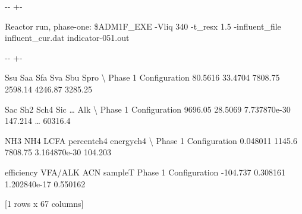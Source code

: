 \documentclass[a4paper,10pt,english]{sphinxmanual}
\newlength\nbsphinxcodecellspacing
\begin{document}
{

\kern-\sphinxverbatimsmallskipamount\kern-\baselineskip
\kern+\FrameHeightAdjust\kern-\fboxrule
\vspace{\nbsphinxcodecellspacing}

\begin{sphinxVerbatim}[commandchars=\\\{\}]
Reactor run, phase-one:
\$ADM1F\_EXE  -Vliq 340 -t\_resx 1.5 -influent\_file influent\_cur.dat
indicator-051.out
\end{sphinxVerbatim}
}

{

\kern-\sphinxverbatimsmallskipamount\kern-\baselineskip
\kern+\FrameHeightAdjust\kern-\fboxrule
\vspace{\nbsphinxcodecellspacing}

\begin{sphinxVerbatim}[commandchars=\\\{\}]
\llap{\color{nbsphinxout}[11]:\,\hspace{\fboxrule}\hspace{\fboxsep}}                          Ssu      Saa      Sfa      Sva      Sbu     Spro   \textbackslash{}
Phase 1 Configuration  80.5616  33.4704  7808.75  2598.14  4246.87  3285.25

                          Sac      Sh2          Sch4      Sic   {\ldots}     Alk   \textbackslash{}
Phase 1 Configuration  9696.05  28.5069  7.737870e-30  147.214  {\ldots}  60316.4

                           NH3     NH4     LCFA    percentch4    energych4   \textbackslash{}
Phase 1 Configuration  0.048011  1145.6  7808.75  3.164870e-30      104.203

                       efficiency   VFA/ALK           ACN   sampleT
Phase 1 Configuration    -104.737  0.308161  1.202840e-17  0.550162

[1 rows x 67 columns]
\end{sphinxVerbatim}
}
\end{document}
